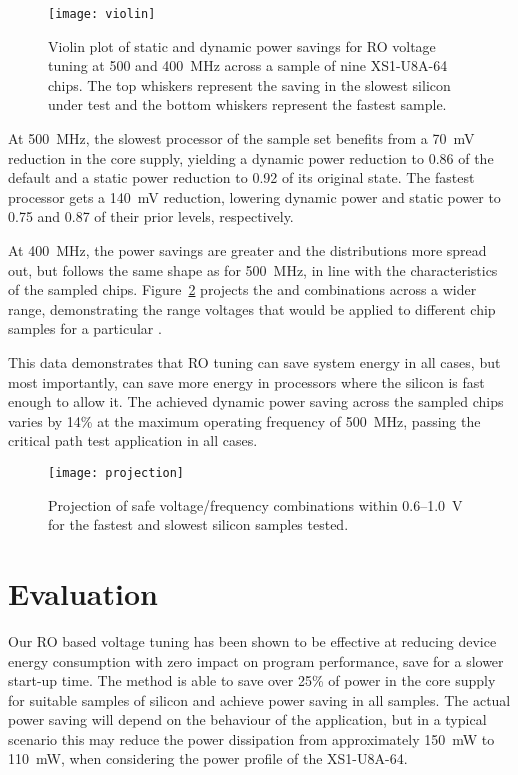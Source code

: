 \documentclass[a4paper,twocolumn,DIV=16]{scrartcl}
\begin{document}
\begin{figure}
\centerline{\texttt{[image: violin]}}
\caption{Violin plot of static and dynamic power savings for RO voltage tuning
at 500 and 400~MHz across a sample of nine XS1-U8A-64 chips. The top whiskers
represent the saving in the slowest silicon under test and the bottom whiskers
represent the fastest sample.}
\label{fig:savings}
\end{figure}

At 500~MHz, the slowest processor of the sample set benefits from a 70~mV
reduction in the core supply, yielding a dynamic power reduction to 0.86 of the
default and a static power reduction to 0.92 of its original state. The
fastest processor gets a 140~mV reduction, lowering dynamic power and static
power to 0.75 and 0.87 of their prior levels, respectively.

At 400~MHz, the power savings are greater and the distributions more spread out,
but follows the same shape as for 500~MHz, in line with the characteristics of
the sampled chips. Figure~\ref{fig:projection} projects the  and
 combinations across a wider range, demonstrating the range voltages
that would be applied to different chip samples for a particular .

This data demonstrates that RO tuning can save system energy in all cases, but
most importantly, can save more energy in processors where the silicon is fast
enough to allow it. The achieved dynamic power saving across the sampled chips
varies by 14\% at the maximum operating frequency of 500~MHz, passing the
critical path test application in all cases.


\begin{figure}
\centerline{\texttt{[image: projection]}}
\caption{Projection of safe voltage/frequency combinations within 0.6--1.0~V
for the fastest and slowest silicon samples tested.}
\label{fig:projection}
\end{figure}

\section{Evaluation}
\label{sec:ev}

Our RO based voltage tuning has been shown to be effective at reducing device
energy consumption with zero impact on program performance, save for a slower
start-up time. The method is able to save over 25\% of power in the core supply
for suitable samples of silicon and achieve power saving in all samples. The
actual power saving will depend on the behaviour of the application, but in a
typical scenario this may reduce the power dissipation from approximately 150~mW
to 110~mW, when considering the power profile of the XS1-U8A-64.
\end{document}
